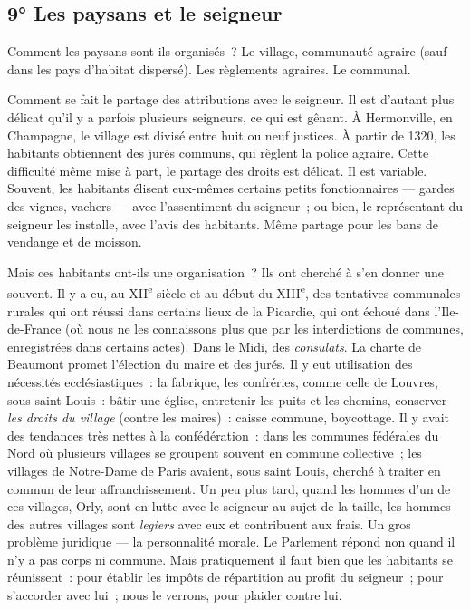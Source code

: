 \documentclass[french,twoside]{book} %
\begin{document}
\subsection[{9° Les paysans et le seigneur}]{9° Les paysans et le seigneur}
\noindent Comment les paysans sont-ils organisés ? Le village, communauté agraire (sauf dans les pays d’habitat dispersé). Les règlements agraires. Le communal.\par
Comment se fait le partage des attributions avec le seigneur. Il est d’autant plus délicat qu’il y a parfois plusieurs seigneurs, ce qui est gênant. À Hermonville, en Champagne, le village est divisé entre huit ou neuf justices. À partir de 1320, les habitants obtiennent des jurés communs, qui règlent la police agraire. Cette difficulté même mise à part, le partage des droits est délicat. Il est variable. Souvent, les habitants élisent eux-mêmes certains petits fonctionnaires — gardes des vignes, vachers — avec l’assentiment du seigneur ; ou bien, le représentant du seigneur les installe, avec l’avis des habitants. Même partage pour les bans de vendange et de moisson.\par
Mais ces habitants ont-ils une organisation ? Ils ont cherché à s’en donner une souvent. Il y a eu, au XII\textsuperscript{e} siècle et au début du XIII\textsuperscript{e}, des tentatives communales rurales qui ont réussi dans certains lieux de la Picardie, qui ont échoué dans l’Ile-de-France (où nous ne les connaissons plus que par les interdictions de communes, enregistrées dans certains actes). Dans le Midi, des \emph{consulats}. La charte de Beaumont promet l’élection du maire et des jurés. Il y eut utilisation des nécessités ecclésiastiques : la fabrique, les confréries, comme celle de Louvres, sous saint Louis : bâtir une église, entretenir les puits et les chemins, conserver \emph{les droits du village} (contre les maires) : caisse commune, boycottage. Il y  
\label{p63} avait des tendances très nettes à la confédération : dans les communes fédérales du Nord où plusieurs villages se groupent souvent en commune collective ; les villages de Notre-Dame de Paris avaient, sous saint Louis, cherché à traiter en commun de leur affranchissement. Un peu plus tard, quand les hommes d’un de ces villages, Orly, sont en lutte avec le seigneur au sujet de la taille, les hommes des autres villages sont \emph{legiers} avec eux et contribuent aux frais. Un gros problème juridique — la personnalité morale. Le Parlement répond non quand il n’y a pas corps ni commune. Mais pratiquement il faut bien que les habitants se réunissent : pour établir les impôts de répartition au profit du seigneur ; pour s’accorder avec lui ; nous le verrons, pour plaider contre lui.\par
\end{document}
